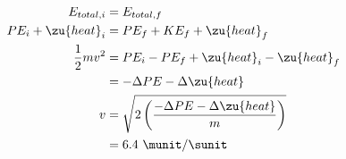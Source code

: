 \begin{align*}
		E_{total,i}	 &=    E_{total,f}  \\
		PE_i + \zu{heat}_i	 &=    PE_f+ KE_f+ \zu{heat}_f  \\
		\frac{1}{2}mv^2	 &=    PE_i - PE_f + \zu{heat}_i- \zu{heat}_f  \\
				 &=    -\Delta PE -\Delta \zu{heat}  \\
		v		 &=    \sqrt{2\left(\frac{-\Delta PE-\Delta \zu{heat}}{m}\right)}  \\
				 &=    6.4\ \munit/\sunit  
\end{align*}



